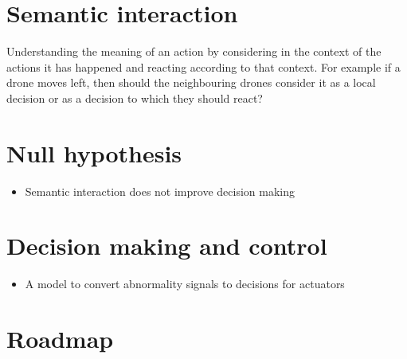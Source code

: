 \documentclass{article}
\begin{document}
		\section{Semantic interaction}
		Understanding the meaning of an action by considering in the context of the actions it has happened and reacting according to that context. For example if a drone moves left, then should the neighbouring drones consider it as a local decision or as a decision to which they should react? 
		

	\section{Null hypothesis}
		\begin{itemize}
			\item Semantic interaction does not improve decision making
		\end{itemize}
	
	\section{Decision making and control}
		\begin{itemize}
			\item A model to convert abnormality signals to decisions for actuators 
		\end{itemize}
	
	\section{Roadmap}
	
	
\end{document}
